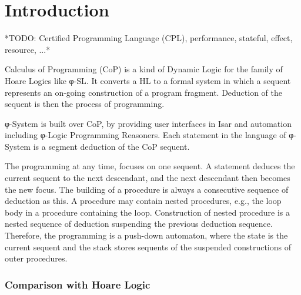 \section{Introduction}

*TODO: Certified Programming Language (CPL), performance, stateful, effect, resource, ...*

Calculus of Programming (CoP) is a kind of Dynamic Logic for the family of Hoare Logics like φ-SL.
It converts a HL to a formal system in which a sequent represents an on-going construction of
a program fragment. Deduction of the sequent is then the process of programming.

φ-System is built over CoP, by providing user interfaces in Isar and automation including φ-Logic
Programming Reasoners.
Each statement in the language of φ-System is a segment deduction of the CoP sequent.

The programming at any time, focuses on one sequent.
A statement deduces the current sequent to the next descendant, and the next descendant then becomes
the new focus.
The building of a procedure is always a consecutive sequence of deduction as this.
A procedure may contain nested procedures, e.g., the loop body in a procedure containing the loop.
Construction of nested procedure is a nested sequence of deduction suspending the previous deduction
sequence.
Therefore, the programming is a push-down automaton, where the state is the current sequent and the
stack stores sequents of the suspended constructions of outer procedures.

\subsubsection{Comparison with Hoare Logic}

